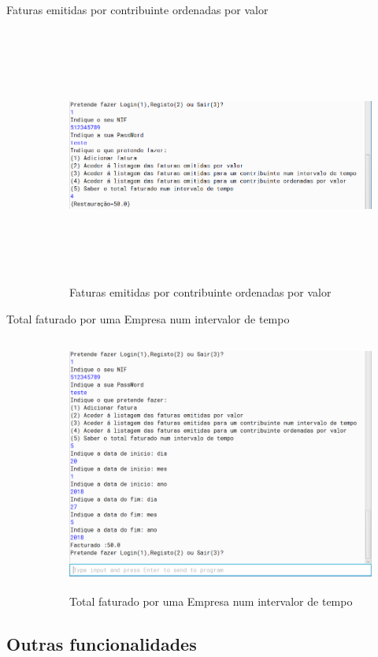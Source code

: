 \documentclass[a4paper]{article}
\begin{document}
\begin{description}
				\item[Faturas emitidas por contribuinte ordenadas por valor]
					\begin{figure}[htbp]
						\centering
						\includegraphics[width = 320pt,height = 240pt]{faturasordenadasporvalor.png}
						\caption{Faturas emitidas por contribuinte ordenadas por valor}
					\end{figure}
				\item[Total faturado por uma Empresa num intervalor de tempo]
					\begin{figure}[htbp]
						\centering
						\includegraphics[width = 320pt,height = 240pt]{totalfaturadoempresa.png}
						\caption{Total faturado por uma Empresa num intervalor de tempo}
					\end{figure}
			\end{description}

	\subsection{Outras funcionalidades}
\end{document}
